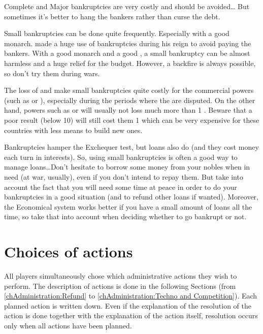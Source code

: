 \begin{playtip}
  Complete and Major bankruptcies are very costly and should be avoided\ldots
  But sometimes it's better to hang the bankers rather than curse the debt.

  Small bankruptcies can be done quite frequently. Especially with a good
  monarch.  made a huge use of bankruptcies during his
  reign to avoid paying the bankers. With a good monarch and a good \STAB, a
  small bankruptcy can be almost harmless and a huge relief for the
  budget. However, a backfire is always possible, so don't try them during
  wars.

  The loss of \TradeFLEET and \TFI make small bankruptcies quite costly for
  the commercial powers (such as \ANG or \HOL), especially during the periods
  where the  are disputed. On the other hand, powers such
  as \RUS or \POL will usually not loss much more than 1 \STAB. Beware that a
  poor result (below 10) will still cost them 1 \MNU which can be very
  expensive for these countries with less means to build new ones.

  Bankruptcies hamper the Exchequer test, but loans also do (and they cost
  money each turn in interests). So, using small bankruptcies is often a good
  way to manage loans\ldots Don't hesitate to borrow some money from your
  nobles when in need (at war, usually), even if you don't intend to repay
  them. But take into account the fact that you will need some time at peace
  in order to do your bankruptcies in a good situation (and to refund other
  loans if wanted). Moreover, the Economical system works better if you have a
  small amount of loans all the time, so take that into account when deciding
  whether to go bankrupt or not.
\end{playtip}



\section{Choices of actions}\label{chAdministration:Choice of actions}
\aparag All players simultaneously chose which administrative actions they
wish to perform. The description of actions is done in the following Sections
(from \ref{chAdministration:Refund} to \ref{chAdministration:Techno and Competition}).
\bparag Each planned action is written down. Even if the explanation of the
resolution of the action is done together with the explanation of the action
itself, resolution occurs only when all actions have been planned.

